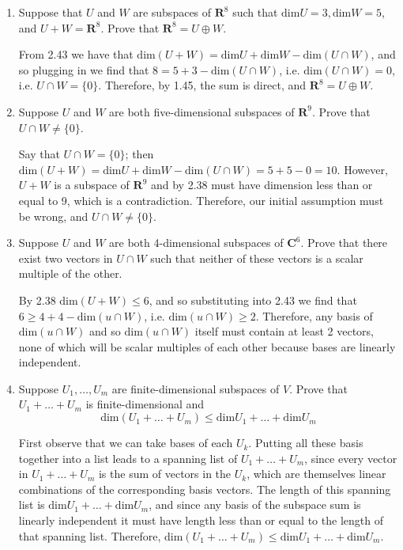 \documentclass{book}
\begin{document}
\begin{enumerate}
\item Suppose that \(U\) and \(W\) are subspaces of \(\textbf{R}^8\) such that \(\textrm{dim}U=3,\textrm{dim}W=5\), and \(U+W=\textbf{R}^8\).  Prove that \(\textbf{R}^8=U \oplus W\).

From 2.43 we have that \(\textrm{dim}(U+W)=\textrm{dim}U+\textrm{dim}W-\textrm{dim}(U \cap W)\), and so plugging in we find that \(8=5+3-\textrm{dim}(U \cap W)\), i.e. \(\textrm{dim}(U \cap W)=0\), i.e. \(U \cap W=\{0\}\).  Therefore, by 1.45, the sum is direct, and \(\textbf{R}^8=U \oplus W\).

\item Suppose \(U\) and \(W\) are both five-dimensional subspaces of \(\textbf{R}^9\).  Prove that \(U \cap W \neq \{0\}\).

Say that \(U \cap W = \{0\}\); then \(\textrm{dim}(U+W)=\textrm{dim}U+\textrm{dim}W-\textrm{dim}(U \cap W)=5+5-0=10\).  However, \(U+W\) is a subspace of \(\textbf{R}^9\) and by 2.38 must have dimension less than or equal to 9, which is a contradiction.  Therefore, our initial assumption must be wrong, and \(U \cap W \neq \{0\}\).

\item Suppose \(U\) and \(W\) are both 4-dimensional subspaces of \(\textbf{C}^6\).  Prove that there exist two vectors in \(U \cap W\) such that neither of these vectors is a scalar multiple of the other.

By 2.38 \(\textrm{dim}(U+W) \leq 6\), and so substituting into 2.43 we find that \(6 \geq 4+4-\textrm{dim}(u \cap W)\), i.e. \(\textrm{dim}(u \cap W) \geq 2\).  Therefore, any basis of \(\textrm{dim}(u \cap W)\) and so \(\textrm{dim}(u \cap W)\) itself must contain at least 2 vectors, none of which will be scalar multiples of each other because bases are linearly independent.

\item Suppose \(U_1,\dots,U_m\) are finite-dimensional subspaces of \(V\).  Prove that \(U_1+\dots+U_m\) is finite-dimensional and \[\textrm{dim}(U_1+\dots+U_m) \leq \textrm{dim}U_1+ \dots + \textrm{dim}U_m\]

First observe that we can take bases of each \(U_k\).  Putting all these basis together into a list leads to a spanning list of \(U_1+\dots+U_m\), since every vector in \(U_1+\dots+U_m\) is the sum of vectors in the \(U_k\), which are themselves linear combinations of the corresponding basis vectors.  The length of this spanning list is \(\textrm{dim}U_1+ \dots + \textrm{dim}U_m\), and since any basis of the subspace sum is linearly independent it must have length less than or equal to the length of that spanning list.  Therefore,  \(\textrm{dim}(U_1+\dots+U_m) \leq \textrm{dim}U_1+ \dots + \textrm{dim}U_m\).


\end{enumerate}
\end{document}
